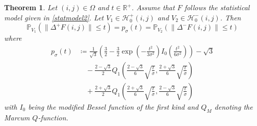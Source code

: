 \documentclass[a4paper,12pt]{article}
\newcommand{\norm}[1]{\lVert#1\rVert}
\theoremstyle{plain}
\newtheorem{theorem}{Theorem}[section]
\theoremstyle{definition}
\begin{document}
\begin{theorem}\label{thm: cdf}
	Let $(i, j) \in \Omega$ and $t \in \mathbb{R}^+$. Assume that $F$ follows the statistical model given in \eqref{statmodel2}. Let $V_1 \in \mathcal{H}_0^+(i, j)$ and $V_2 \in \mathcal{H}_0^-(i, j)$. Then
	\begin{equation}\label{eq: probequality}
		\mathbb{P}_{V_1}( \norm{\Delta^+ F(i, j)} \leq t ) = p_\sigma(t) = \mathbb{P}_{V_2}( \norm{\Delta^- F(i, j)} \leq t )
	\end{equation}
	where
	\begin{equation}\label{eq: cdf}
		\begin{aligned}
			p_\sigma(t) &\coloneqq \frac{1}{\sqrt{3}} \left( \frac{3}{2} - \frac{3}{2} \exp \left( - \frac{t^2}{3 \sigma^2} \right) I_0 \left( \frac{t^2}{6 \sigma^2} \right) \right) - \sqrt{3} \\
			&\quad - \frac{2 - \sqrt{3}}{2} Q_1 \left( \frac{2 - \sqrt{3}}{6} \sqrt{\frac{t}{\sigma}}, \frac{2 + \sqrt{3}}{6} \sqrt{\frac{t}{\sigma}} \right) \\
			&\quad + \frac{2 + \sqrt{3}}{2} Q_1 \left( \frac{2 + \sqrt{3}}{6} \sqrt{\frac{t}{\sigma}}, \frac{2 - \sqrt{3}}{6} \sqrt{\frac{t}{\sigma}} \right)
		\end{aligned}
	\end{equation}
	with $I_0$ being the modified Bessel function of the first kind and $Q_M$ denoting the Marcum $Q$-function.
\end{theorem}
\end{document}
